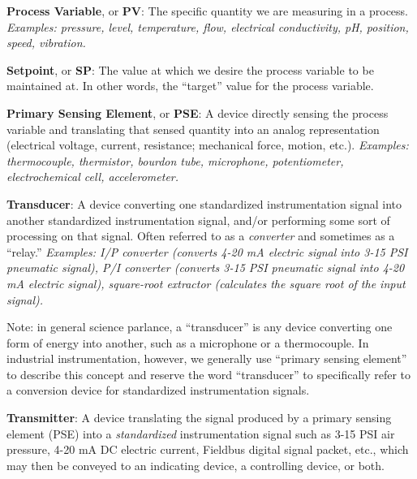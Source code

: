 \noindent
\textbf{Process Variable}, or \textbf{PV}: The specific quantity we are measuring in a process.  \textit{Examples: pressure, level, temperature, flow, electrical conductivity, pH, position, speed, vibration.} 

\vskip 10pt

\noindent
\textbf{Setpoint}, or \textbf{SP}: The value at which we desire the process variable to be maintained at.  In other words, the ``target'' value for the process variable. 

\vskip 10pt

\noindent
\textbf{Primary Sensing Element}, or \textbf{PSE}: A device directly sensing the process variable and translating that sensed quantity into an analog representation (electrical voltage, current, resistance; mechanical force, motion, etc.).  \textit{Examples: thermocouple, thermistor, bourdon tube, microphone, potentiometer, electrochemical cell, accelerometer.} 

\vskip 10pt

\noindent
\textbf{Transducer}: A device converting one standardized instrumentation signal into another standardized instrumentation signal, and/or performing some sort of processing on that signal.  Often referred to as a \textit{converter} and sometimes as a ``relay.''  \textit{Examples: I/P converter (converts 4-20 mA electric signal into 3-15 PSI pneumatic signal), P/I converter (converts 3-15 PSI pneumatic signal into 4-20 mA electric signal), square-root extractor (calculates the square root of the input signal).}     

Note: in general science parlance, a ``transducer'' is any device converting one form of energy into another, such as a microphone or a thermocouple.  In industrial instrumentation, however, we generally use ``primary sensing element'' to describe this concept and reserve the word ``transducer'' to specifically refer to a conversion device for standardized instrumentation signals.

\vskip 10pt

\noindent
\textbf{Transmitter}: A device translating the signal produced by a primary sensing element (PSE) into a \textit{standardized} instrumentation signal such as 3-15 PSI air pressure, 4-20 mA DC electric current, Fieldbus digital signal packet, etc., which may then be conveyed to an indicating device, a controlling device, or both. 

